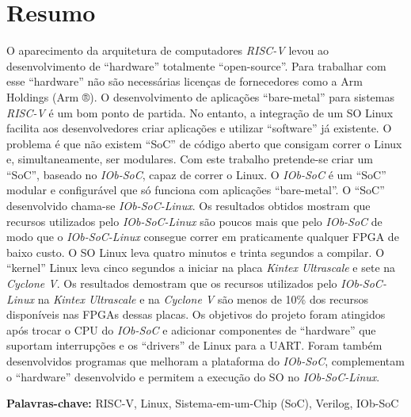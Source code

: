 \cleardoubleoddpage

\chapter*{Resumo}

O aparecimento da arquitetura de computadores \textit{RISC-V} levou ao desenvolvimento de “hardware” totalmente “open-source”. Para trabalhar com esse “hardware” não são necessárias licenças de fornecedores como a Arm Holdings (Arm ®). O desenvolvimento de aplicações “bare-metal” para sistemas \textit{RISC-V} é um bom ponto de partida. No entanto, a integração de um SO Linux facilita aos desenvolvedores criar  aplicações e utilizar “software” já existente. O problema é que não existem “SoC” de código aberto que consigam correr o Linux e, simultaneamente, ser modulares.  
%  
Com este trabalho pretende-se criar um “SoC”, baseado no \textit{IOb-SoC}, capaz de correr o Linux. O \textit{IOb-SoC} é um “SoC” modular e configurável que só funciona com aplicações “bare-metal”. O “SoC” desenvolvido chama-se \textit{IOb-SoC-Linux}. Os resultados obtidos mostram que recursos utilizados pelo \textit{IOb-SoC-Linux} são poucos mais que pelo \textit{IOb-SoC} de modo que o \textit{IOb-SoC-Linux} consegue correr em praticamente qualquer FPGA de baixo custo. O SO Linux leva quatro minutos e trinta segundos a compilar. O “kernel” Linux leva cinco segundos a iniciar na placa \textit{Kintex Ultrascale} e sete na \textit{Cyclone V}. Os resultados demostram que os recursos utilizados pelo \textit{IOb-SoC-Linux} na \textit{Kintex Ultrascale} e na \textit{Cyclone V} são menos de 10\% dos recursos disponíveis nas FPGAs dessas placas.
%
Os objetivos do projeto foram atingidos após trocar o CPU do \textit{IOb-SoC} e adicionar componentes de “hardware” que suportam interrupções e os “drivers” de Linux para a UART. Foram também desenvolvidos programas que melhoram a plataforma do \textit{IOb-SoC}, complementam o “hardware” desenvolvido e permitem a execução do SO no \textit{IOb-SoC-Linux}.

\vfill

\textbf{\Large Palavras-chave:} RISC-V, Linux, Sistema-em-um-Chip (SoC), Verilog, IOb-SoC

